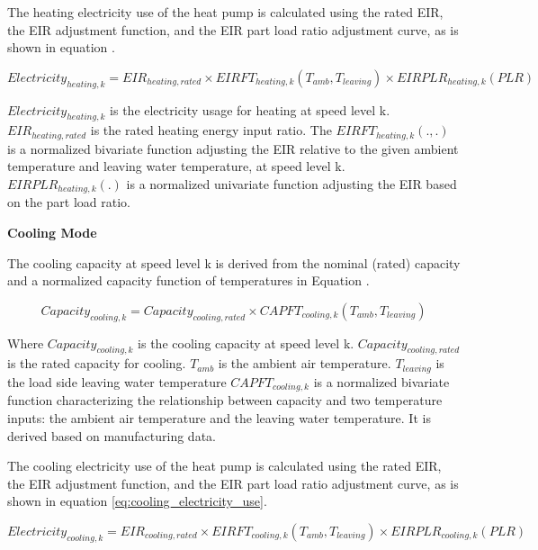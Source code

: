 The heating electricity use of the heat pump is calculated using the rated EIR,
the EIR adjustment function, and the EIR part load ratio adjustment curve, as is
shown in equation .

\begin{equation}\label{eq:heating_electricity_use}
Electricity_{heating,k}=EIR_{heating,rated} \times EIRFT_{heating,k}(T_{amb}, T_{leaving}) \times EIRPLR_{heating,k}(PLR)       
\end{equation}

$Electricity_{heating,k}$ is the electricity usage for heating at speed level k.
$EIR_{heating,rated}$ is the rated heating energy input ratio. The
$EIRFT_{heating,k}(., .)$ is a normalized bivariate function adjusting the EIR
relative to the given ambient temperature and leaving water temperature, at
speed level k. $EIRPLR_{heating,k}(.)$ is a normalized univariate function
adjusting the EIR based on the part load ratio.

\noindent\textbf{Cooling Mode}

The cooling capacity at speed level k is derived from the nominal (rated)
capacity and a normalized capacity function of temperatures in Equation .

\begin{equation}
Capacity_{cooling,k}=Capacity_{cooling,rated} \times CAPFT_{cooling,k}(T_{amb},T_{leaving})	                 
\end{equation}

Where $Capacity_{cooling,k}$ is the cooling capacity at speed level k.
$Capacity_{cooling,rated}$ is the rated capacity for cooling. $T_{amb}$ is the ambient air
temperature. $T_{leaving}$ is the load side leaving water temperature $CAPFT_{cooling,k}$
is a normalized bivariate function characterizing the relationship between
capacity and two temperature inputs: the ambient air temperature and the leaving
water temperature. It is derived based on manufacturing data.

The cooling electricity use of the heat pump is calculated using the rated EIR,
the EIR adjustment function, and the EIR part load ratio adjustment curve, as is
shown in equation \ref{eq:cooling_electricity_use}.

\begin{equation}\label{eq:cooling_electricity_use}
Electricity_{cooling,k}=EIR_{cooling,rated} \times EIRFT_{cooling,k}(T_{amb}, T_{leaving}) \times EIRPLR_{cooling,k}(PLR)       
\end{equation}

